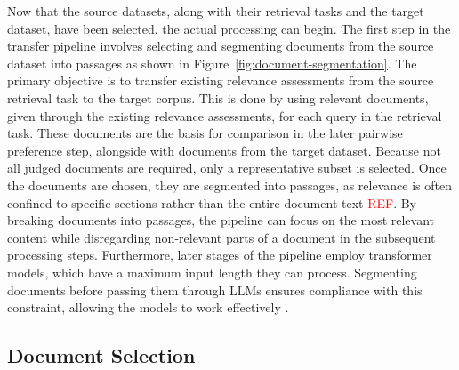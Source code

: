 Now that the source datasets, along with their retrieval tasks and the target dataset, have been selected, the actual processing can begin. The first step in the transfer pipeline involves selecting and segmenting documents from the source dataset into passages as shown in Figure~\ref{fig:document-segmentation}. The primary objective is to transfer existing relevance assessments from the source retrieval task to the target corpus. This is done by using relevant documents, given through the existing relevance assessments, for each query in the retrieval task. These documents are the basis for comparison in the later pairwise preference step, alongside with documents from the target dataset. Because not all judged documents are required, only a representative subset is selected. Once the documents are chosen, they are segmented into passages, as relevance is often confined to specific sections rather than the entire document text \textcolor{red}{REF}. By breaking documents into passages, the pipeline can focus on the most relevant content while disregarding non-relevant parts of a document in the subsequent processing steps. Furthermore, later stages of the pipeline employ transformer models, which have a maximum input length they can process. Segmenting documents before passing them through LLMs ensures compliance with this constraint, allowing the models to work effectively \citep{levy:2024}.

\subsection{Document Selection}\label{document-selection}

